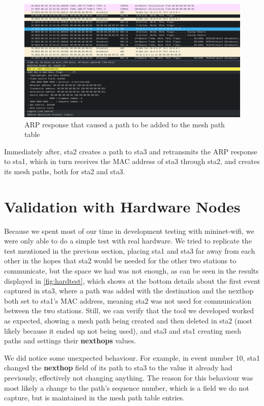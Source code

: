 \begin{figure}[htb]
   \centering
   \includegraphics[scale=.35]{capsta3}
   \caption{\ac{ARP} response that caused a path to be added to the mesh path table}\label{fig:capsta3}
\end{figure}

Immediately after, sta2 creates a path to sta3 and retransmits the \ac{ARP}
response to sta1, which in turn receives the \ac{MAC} address of sta3 through
sta2, and creates its mesh paths, both for sta2 and sta3.


\section{Validation with Hardware Nodes}\label{sect:valid}

Because we spent most of our time in development testing with mininet-wifi, we
were only able to do a simple test with real hardware. We tried to replicate the
test mentioned in the previous section, placing sta1 and sta3 far away from each
other in the hopes that sta2 would be needed for the other two stations to
communicate, but the space we had was not enough, as can be seen in the results
displayed in \autoref{fig:hardtest}, which shows at the bottom details about the
first event captured in sta3, where a path was added with the destination and
the nexthop both set to sta1's \ac{MAC} address, meaning sta2 was not used for
communication between the two stations. Still, we can verify that the tool we
developed worked as expected, showing a mesh path being created and then deleted
in sta2 (most likely because it ended up not being used), and sta3 and sta1
creating mesh paths and settings their \textbf{nexthops} values.

We did notice some unexpected behaviour. For example, in event number 10, sta1
changed the \textbf{nexthop} field of its path to sta3 to the value it already
had previously, effectively not changing anything. The reason for this behaviour
was most likely a change to the path's sequence number, which is a field we do
not capture, but is maintained in the mesh path table entries.
